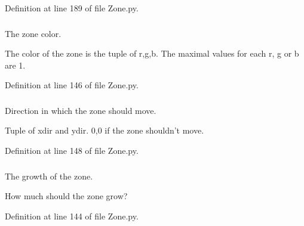 Definition at line 189 of file Zone.py.

\hypertarget{class_zone_1_1_zone_a0e94d3602835417fef9d1345cf1e739c}{
\subsubsection[{color}]{}}
\label{class_zone_1_1_zone_a0e94d3602835417fef9d1345cf1e739c}


The zone color. 

The color of the zone is the tuple of r,g,b. The maximal values for each r, g or b are 1. 

Definition at line 146 of file Zone.py.

\hypertarget{class_zone_1_1_zone_a20a50ae6ea7f05c4bb403ef0306ba83f}{
\subsubsection[{dir}]{}}
\label{class_zone_1_1_zone_a20a50ae6ea7f05c4bb403ef0306ba83f}


Direction in which the zone should move. 

Tuple of xdir and ydir. 0,0 if the zone shouldn't move. 

Definition at line 148 of file Zone.py.

\hypertarget{class_zone_1_1_zone_a42d231813671766976464bbf2dfdf387}{
\subsubsection[{growth}]{}}
\label{class_zone_1_1_zone_a42d231813671766976464bbf2dfdf387}


The growth of the zone. 

How much should the zone grow? 

Definition at line 144 of file Zone.py.

\hypertarget{class_zone_1_1_zone_a574bf43b0f15767743c104faabbae973}{
\subsubsection[{interactive}]{}}
\label{class_zone_1_1_zone_a574bf43b0f15767743c104faabbae973}


